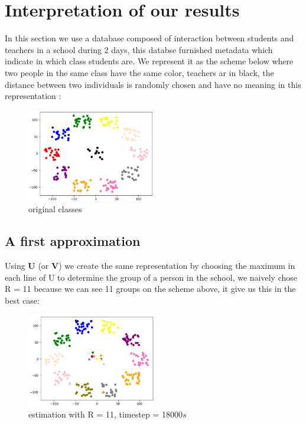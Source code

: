 \documentclass{article}
\begin{document}
\section{Interpretation of our results}

In this section we use a database composed of interaction between students and teachers in a school during 2 days, this databse furnished
metadata which indicate in which class students are. We represent it as the scheme below where two people in the same class have the same color, teachers ar in black,
the distance between two individuals is randomly chosen and have no meaning in this representation :

\begin{figure}[H]
    \centering
    \includegraphics[width=0.5\textwidth]{images/original_class.png}
    \caption{original classes}
\end{figure}

\subsection{A first approximation}
Using $\mathbf{U}$ (or $\mathbf{V}$) we create the same representation by choosing the maximum in each line of U to determine the group of a person in the school,
we naively chose R = 11 because we can see 11 groups on the scheme above, it give us this in the best case:

\begin{figure}[H]
    \centering
    \includegraphics[width=0.5\textwidth]{images/naive_approach_r=11_t=18000.png}
    \caption{estimation with R = 11, timestep = 18000$s$}
\end{figure}
\end{document}
